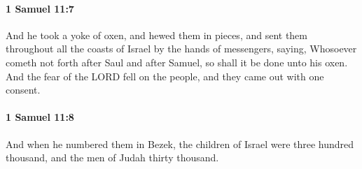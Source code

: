 		\paragraph{1 Samuel 11:7} %
			\label{1SAMUEL-11-7}

			And he took a yoke of oxen, and hewed them in pieces, and sent them throughout all the coasts of Israel by the hands of messengers, saying, Whosoever cometh not forth after Saul and after Samuel, so shall it be done unto his oxen. And the fear of the LORD fell on the people, and they came out with one consent.


		\paragraph{1 Samuel 11:8} %
			\label{1SAMUEL-11-8}

			And when he numbered them in Bezek, the children of Israel were three hundred thousand, and the men of Judah thirty thousand.


